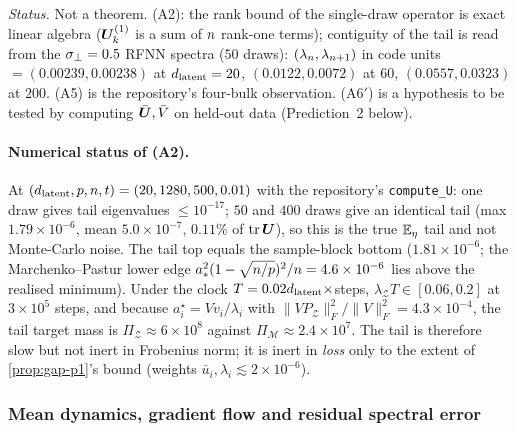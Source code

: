 \noindent\emph{Status.} Not a theorem. (A2): the rank bound of the single-draw operator is exact linear algebra ($\bm{U}^{(1)}_k$ is a sum of $n$ rank-one terms); contiguity of the tail is read from the $\sigma_{\perp}=0.5$ RFNN spectra ($50$ draws): $(\lambda_{n},\lambda_{n+1})$ in code units $=(0.00239,0.00238)$ at $d_{\mathrm{latent}}=20$, $(0.0122,0.0072)$ at $60$, $(0.0557,0.0323)$ at $200$. (A5) is the repository's four-bulk observation. (A6$'$) is a hypothesis to be tested by computing $\bar{\bm{U}},\bar V$ on held-out data (Prediction~2 below).

\paragraph{Numerical status of (A2).}
At $(d_{\mathrm{latent}},p,n,t)=(20,1280,500,0.01)$ with the repository's \texttt{compute\_U}: one draw gives tail eigenvalues $\le10^{-17}$; $50$ and $400$ draws give an identical tail (max $1.79\times10^{-6}$, mean $5.0\times10^{-7}$, $0.11\%$ of $\operatorname{tr}\bm{U}$), so this is the true $\mathbb{E}_\eta$ tail and not Monte-Carlo noise. The tail top equals the sample-block bottom ($1.81\times10^{-6}$; the Marchenko--Pastur lower edge $a_*^2(1-\sqrt{n/p})^2/n=4.6\times10^{-6}$ lies above the realised minimum). Under the clock $T=0.02d_{\mathrm{latent}}\times$steps, $\lambda_{\mathcal Z}T\in[0.06,0.2]$ at $3\times10^5$ steps, and because $a_i^\star=Vv_i/\lambda_i$ with $\|VP_{\mathcal Z}\|_F^2/\|V\|_F^2=4.3\times10^{-4}$, the tail target mass is $\Pi_{\mathcal Z}\approx6\times10^8$ against $\Pi_{\mathcal M}\approx2.4\times10^7$. The tail is therefore slow but not inert in Frobenius norm; it is inert in \emph{loss} only to the extent of \cref{prop:gap-p1}'s bound (weights $\bar u_i,\lambda_i\lesssim2\times10^{-6}$).

\subsubsection{Mean dynamics, gradient flow and residual spectral error}

